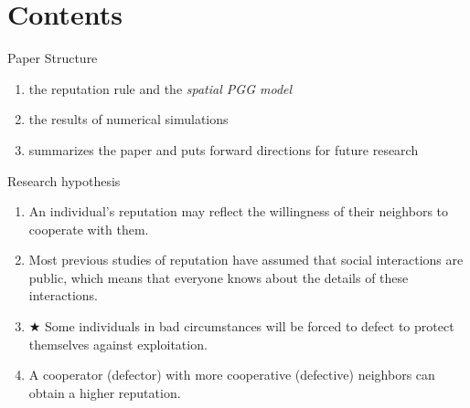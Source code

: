 \documentclass[notheorems,11pt,compress]{beamer}
\numberwithin{figure}{section}
\numberwithin{table}{section}
\numberwithin{equation}{section}
\theoremstyle{plain}
\numberwithin{theorem}{section}
\numberwithin{definition}{section}
\numberwithin{lemma}{section}
\numberwithin{proposition}{section}
\numberwithin{corollary}{section}
\theoremstyle{example}
\begin{document}
\section{Contents} %


\begin{frame}{Paper Structure}
	\begin{enumerate}
		\item the reputation rule and the \textit{spatial PGG model}
		\item the results of numerical simulations
		\item summarizes the paper and puts forward directions for future research
	\end{enumerate}
\end{frame}


\begin{frame}{Research hypothesis}  %


	\begin{enumerate}
		\item An individual’s reputation may reflect the willingness of their neighbors to cooperate with them.
		      \vspace*{1ex}
		\item Most previous studies of reputation have assumed that social interactions are public, which means that everyone knows about the details of these interactions.
		      \vspace*{1ex}
		\item $\bigstar$ Some individuals in bad circumstances will be forced to defect to protect themselves against exploitation.
		      \vspace*{1ex}
		\item A cooperator (defector) with more cooperative (defective) neighbors can obtain a higher reputation.
	\end{enumerate}

\end{frame}
\end{document}
